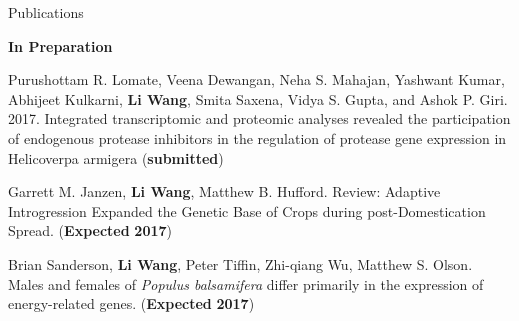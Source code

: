 \documentclass{resume} %
\begin{document}
\begin{rSection}{Publications}{}{}
\begin{rSubsection}{\textbf{In Preparation}}{}{}{}
\item Purushottam R. Lomate, Veena Dewangan, Neha S. Mahajan, Yashwant Kumar, Abhijeet Kulkarni, \textbf{Li Wang}, Smita Saxena, Vidya S. Gupta, and Ashok P. Giri. 2017. Integrated transcriptomic and proteomic analyses revealed the participation of endogenous protease inhibitors in the regulation of protease gene expression in Helicoverpa armigera (\textbf{submitted})
\item Garrett M. Janzen, \textbf{Li Wang}, Matthew B. Hufford. Review: Adaptive Introgression Expanded the Genetic Base of Crops during post-Domestication Spread. (\textbf{Expected} \textbf{2017})
\item Brian Sanderson, \textbf{Li Wang}, Peter Tiffin, Zhi-qiang Wu, Matthew S. Olson. Males and females of \textit{Populus balsamifera} differ primarily in the expression of energy-related genes. (\textbf{Expected} \textbf{2017})



\end{rSubsection}
\end{rSection}
\end{document}
